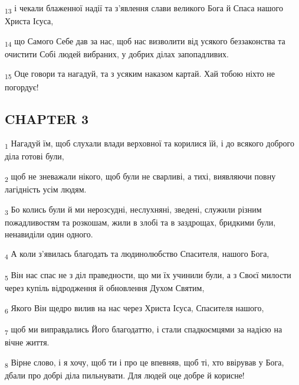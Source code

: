 \begin{tcolorbox}
\textsubscript{13} і чекали блаженної надії та з'явлення слави великого Бога й Спаса нашого Христа Ісуса,
\end{tcolorbox}
\begin{tcolorbox}
\textsubscript{14} що Самого Себе дав за нас, щоб нас визволити від усякого беззаконства та очистити Собі людей вибраних, у добрих ділах запопадливих.
\end{tcolorbox}
\begin{tcolorbox}
\textsubscript{15} Оце говори та нагадуй, та з усяким наказом картай. Хай тобою ніхто не погордує!
\end{tcolorbox}
\subsection{CHAPTER 3}
\begin{tcolorbox}
\textsubscript{1} Нагадуй їм, щоб слухали влади верховної та корилися їй, і до всякого доброго діла готові були,
\end{tcolorbox}
\begin{tcolorbox}
\textsubscript{2} щоб не зневажали нікого, щоб були не сварливі, а тихі, виявляючи повну лагідність усім людям.
\end{tcolorbox}
\begin{tcolorbox}
\textsubscript{3} Бо колись були й ми нерозсудні, неслухняні, зведені, служили різним пожадливостям та розкошам, жили в злобі та в заздрощах, бридкими були, ненавиділи один одного.
\end{tcolorbox}
\begin{tcolorbox}
\textsubscript{4} А коли з'явилась благодать та людинолюбство Спасителя, нашого Бога,
\end{tcolorbox}
\begin{tcolorbox}
\textsubscript{5} Він нас спас не з діл праведности, що ми їх учинили були, а з Своєї милости через купіль відродження й обновлення Духом Святим,
\end{tcolorbox}
\begin{tcolorbox}
\textsubscript{6} Якого Він щедро вилив на нас через Христа Ісуса, Спасителя нашого,
\end{tcolorbox}
\begin{tcolorbox}
\textsubscript{7} щоб ми виправдались Його благодаттю, і стали спадкоємцями за надією на вічне життя.
\end{tcolorbox}
\begin{tcolorbox}
\textsubscript{8} Вірне слово, і я хочу, щоб ти і про це впевняв, щоб ті, хто ввірував у Бога, дбали про добрі діла пильнувати. Для людей оце добре й корисне!
\end{tcolorbox}
